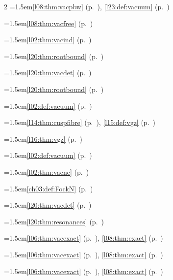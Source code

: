 \begin{multicols}{2}
\hangindent=1.5em\quad \ref{l08:thm:vacpbw} (p.~\pageref{l08:thm:vacpbw}), \ref{l23:def:vacuum} (p.~\pageref{l23:def:vacuum})\par
\hangindent=1.5em\quad \ref{l08:thm:vacfree} (p.~\pageref{l08:thm:vacfree})\par
\hangindent=1.5em\quad \ref{l02:thm:vacind} (p.~\pageref{l02:thm:vacind})\par
\hangindent=1.5em\quad \ref{l20:thm:rootbound} (p.~\pageref{l20:thm:rootbound})\par
\hangindent=1.5em\quad \ref{l20:thm:vacdet} (p.~\pageref{l20:thm:vacdet})\par
\hangindent=1.5em\quad \ref{l20:thm:rootbound} (p.~\pageref{l20:thm:rootbound})\par
\hangindent=1.5em\quad \ref{l02:def:vacuum} (p.~\pageref{l02:def:vacuum})\par
\hangindent=1.5em\quad \ref{l14:thm:cuspfibre} (p.~\pageref{l14:thm:cuspfibre}), \ref{l15:def:vgz} (p.~\pageref{l15:def:vgz})\par
\hangindent=1.5em\quad \ref{l16:thm:vgz} (p.~\pageref{l16:thm:vgz})\par
\hangindent=1.5em\quad \ref{l02:def:vacuum} (p.~\pageref{l02:def:vacuum})\par
\hangindent=1.5em\quad \ref{l02:thm:vacne} (p.~\pageref{l02:thm:vacne})\par
\hangindent=1.5em\quad \ref{ch03:def:FockN} (p.~\pageref{ch03:def:FockN})\par
\hangindent=1.5em\quad \ref{l20:thm:vacdet} (p.~\pageref{l20:thm:vacdet})\par
\hangindent=1.5em\quad \ref{l20:thm:resonances} (p.~\pageref{l20:thm:resonances})\par
\hangindent=1.5em\quad \ref{l06:thm:vacexact} (p.~\pageref{l06:thm:vacexact}), \ref{l08:thm:exact} (p.~\pageref{l08:thm:exact})\par
\hangindent=1.5em\quad \ref{l06:thm:vacexact} (p.~\pageref{l06:thm:vacexact}), \ref{l08:thm:exact} (p.~\pageref{l08:thm:exact})\par
\hangindent=1.5em\quad \ref{l06:thm:vacexact} (p.~\pageref{l06:thm:vacexact}), \ref{l08:thm:exact} (p.~\pageref{l08:thm:exact})\par

\end{multicols}
